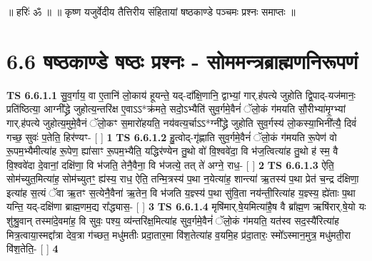 \documentclass[17pt]{extarticle}
\begin{document}
        
        ॥ हरिः॑ ॐ ॥
॥ कृष्ण यजुर्वेदीय तैत्तिरीय संहितायां षष्ठकाण्डे पञ्चमः प्रश्नः समाप्तः ॥ \newline
        \pagebreak
                \pagebreak
        
     \section*{ 6.6       षष्ठकाण्डे षष्ठः प्रश्नः - सोममन्त्रब्राह्मणनिरूपणं }
                                        \textbf{ TS 6.6.1.1} \newline
                  सु॒व॒र्गाय॒ वा ए॒तानि॑ लो॒काय॑ हूयन्ते॒ यद्-दा᳚क्षि॒णानि॒ द्वाभ्यां॒ गार्.ह॑पत्ये जुहोति द्वि॒पाद्-यज॑मानः॒ प्रति॑ष्ठित्या॒ आग्नी᳚द्ध्रे जुहोत्य॒न्तरि॑क्ष ए॒वाऽऽ*क्र॑मते॒ सदो॒ऽभ्यैति॑ सुव॒र्गमे॒वैनं॑ ॅलो॒कं ग॑मयति सौ॒रीभ्या॑मृ॒ग्भ्यां गार्.ह॑पत्ये जुहोत्य॒मुमे॒वैनं ॅलो॒कꣳ स॒मारो॑हयति॒ नय॑वत्य॒र्चाऽऽ*ग्नी᳚द्ध्रे जुहोति सुव॒र्गस्य॑ लो॒कस्या॒भिनी᳚त्यै॒ दिवं॑ गच्छ॒ सुवः॑ प॒तेति॒ हिर॑ण्यꣳ- [  ] \textbf{  1} \newline
                  \newline
                                \textbf{ TS 6.6.1.2} \newline
                  हु॒त्वोद्-गृ॑ह्णाति सुव॒र्गमे॒वैनं॑ ॅलो॒कं ग॑मयति रू॒पेण॑ वो रू॒पम॒भ्यैमीत्या॑ह रू॒पेण॒ ह्या॑साꣳ रू॒पम॒भ्यैति॒ यद्धिर॑ण्येन तु॒थो वो॑ वि॒श्ववे॑दा॒ वि भ॑ज॒त्वित्या॑ह तु॒थो ह॑ स्म॒ वै वि॒श्ववे॑दा दे॒वानां॒ दक्षि॑णा॒ वि भ॑जति॒ तेनै॒वैना॒ वि भ॑जत्ये॒ तत् ते॑ अग्ने॒ राध॒- [  ] \textbf{  2} \newline
                  \newline
                                \textbf{ TS 6.6.1.3} \newline
                  ऐति॒ सोम॑च्युत॒मित्या॑ह॒ सोम॑च्युतꣳ॒॒ ह्य॑स्य॒ राध॒ ऐति॒ तन्मि॒त्रस्य॑ प॒था न॒येत्या॑ह॒ शान्त्या॑ ऋ॒तस्य॑ प॒था प्रेत॑ च॒न्द्र द॑क्षिणा॒ इत्या॑ह स॒त्यं ॅवा ऋ॒तꣳ स॒त्येनै॒वैना॑ ऋ॒तेन॒ वि भ॑जति य॒ज्ञ्स्य॑ प॒था सु॑वि॒ता नय॑न्ती॒रित्या॑ह य॒ज्ञ्स्य॒ ह्ये॑ताः प॒था यन्ति॒ यद्-दक्षि॑णा ब्राह्म॒णम॒द्य रा᳚द्ध्यास॒- [  ] \textbf{  3 } \newline
                  \newline
                                \textbf{ TS 6.6.1.4} \newline
                  मृषि॑मार्.षे॒यमित्या॑है॒ष वै ब्रा᳚ह्म॒ण ऋषि॑रार्.षे॒यो यः शु॑श्रु॒वान् तस्मा॑दे॒वमा॑ह॒ वि सुवः॒ पश्य॒ व्य॑न्तरि॑क्ष॒मित्या॑ह सुव॒र्गमे॒वैनं॑ ॅलो॒कं ग॑मयति॒ यत॑स्व सद॒स्यै॑रित्या॑ह मित्र॒त्वाया॒स्मद्दा᳚त्रा देव॒त्रा ग॑च्छत॒ मधु॑मतीः प्रदा॒तार॒मा वि॑श॒तेत्या॑ह व॒यमि॒ह प्र॑दा॒तारः॒ स्मो᳚ऽस्मान॒मुत्र॒ मधु॑मती॒रा वि॑श॒तेति॒- [  ] \textbf{  4} \newline
\end{document}
